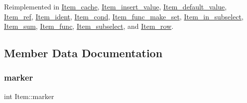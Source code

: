 Reimplemented in \mbox{\hyperlink{classItem__cache_a38750db48a153247ba0b65b6674f11b4}{Item\+\_\+cache}}, \mbox{\hyperlink{classItem__insert__value_a7023df48fccb11a014d348cbde3b35c6}{Item\+\_\+insert\+\_\+value}}, \mbox{\hyperlink{classItem__default__value_aa26d7118262053541ab095b9f9c7d53f}{Item\+\_\+default\+\_\+value}}, \mbox{\hyperlink{classItem__ref_a19c98abd79dbdb19a4af10a7c41f1449}{Item\+\_\+ref}}, \mbox{\hyperlink{classItem__ident_ab74fffc591821c7bc35929085ad82cf9}{Item\+\_\+ident}}, \mbox{\hyperlink{classItem__cond_a6e601f5a22e1625a703c0183a67eca2a}{Item\+\_\+cond}}, \mbox{\hyperlink{classItem__func__make__set_a75791f36ac076834fdd42c7081d8d763}{Item\+\_\+func\+\_\+make\+\_\+set}}, \mbox{\hyperlink{classItem__in__subselect_ae2d9db307c8214b314f387b8f0fca6ae}{Item\+\_\+in\+\_\+subselect}}, \mbox{\hyperlink{classItem__sum_ae323b192d183b3f85bbee92c43685310}{Item\+\_\+sum}}, \mbox{\hyperlink{classItem__func_af98acc318ebbc106d047a1589884f0ff}{Item\+\_\+func}}, \mbox{\hyperlink{classItem__subselect_a163a5d1a04b9bf04d352aca85c084adf}{Item\+\_\+subselect}}, and \mbox{\hyperlink{classItem__row_a7866a24ed779c242c6841735e7de6c04}{Item\+\_\+row}}.



\subsection{Member Data Documentation}
\mbox{\label{classItem_afebd72a3075897b31b17ead8dd1d10eb}} 
\subsubsection{\texorpdfstring{marker}{marker}}
{\footnotesize\ttfamily int Item\+::marker}

